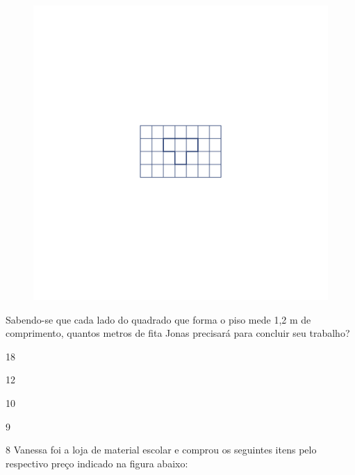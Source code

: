 \begin{figure}[htpb!]
\includegraphics[width=\textwidth]{../ilustracoes/MAT5/SAEB_5ANO_MAT_figura118.png}
\end{figure}

Sabendo-se que cada lado do quadrado que forma o piso mede 1,2 m de
comprimento, quantos metros de fita Jonas precisará para concluir seu
trabalho?

\begin{escolha}
\item
  18
\item
  12
\item
  10
\item
  9
\end{escolha}


\num{8} Vanessa foi a loja de material escolar e comprou os seguintes itens
pelo respectivo preço indicado na figura abaixo:

